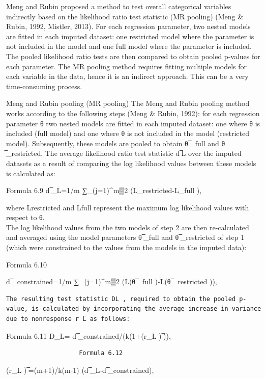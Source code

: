 \documentclass[]{book}
\theoremstyle{definition}
\theoremstyle{definition}
\theoremstyle{definition}
\theoremstyle{remark}
\begin{document}
Meng and Rubin proposed a method to test overall categorical variables
indirectly based on the likelihood ratio test statistic (MR pooling)
(Meng \& Rubin, 1992, Mistler, 2013). For each regression parameter, two
nested models are fitted in each imputed dataset: one restricted model
where the parameter is not included in the model and one full model
where the parameter is included. The pooled likelihood ratio tests are
then compared to obtain pooled p-values for each parameter. The MR
pooling method requires fitting multiple models for each variable in the
data, hence it is an indirect approach. This can be a very
time-consuming process.

Meng and Rubin pooling (MR pooling) The Meng and Rubin pooling method
works according to the following steps (Meng \& Rubin, 1992): for each
regression parameter θ two nested models are fitted in each imputed
dataset: one where θ is included (full model) and one where θ is not
included in the model (restricted model). Subsequently, these models are
pooled to obtain θ ̅\_full and θ ̅\_restricted. The average likelihood
ratio test statistic d ̅L over the imputed datasets as a result of
comparing the log likelihood values between these models is calculated
as:

Formula 6.9 d ̅\_L=1/m ∑\_(j=1)\^{}m▒2 (L\_restricted-L\_full ),

where Lrestricted and Lfull represent the maximum log likelihood values
with respect to θ.\\
The log likelihood values from the two models of step 2 are then
re-calculated and averaged using the model parameters θ ̅\_full and θ
̅\_restricted of step 1 (which were constrained to the values from the
models in the imputed data):

Formula 6.10

d ̅\_constrained=1/m ∑\_(j=1)\^{}m▒2 (L(θ ̅\_full )-L(θ ̅\_restricted )),

\begin{verbatim}
The resulting test statistic DL , required to obtain the pooled p-value, is calculated by incorporating the average increase in variance due to nonresponse r ̅L as follows:
\end{verbatim}

Formula 6.11 D\_L= d ̅\_constrained/(k(1+(r\_L ) ̅)),

\begin{verbatim}
                    Formula 6.12
\end{verbatim}

(r\_L ) ̅=(m+1)/k(m-1) (d ̅\_L-d ̅\_constrained),
\end{document}
